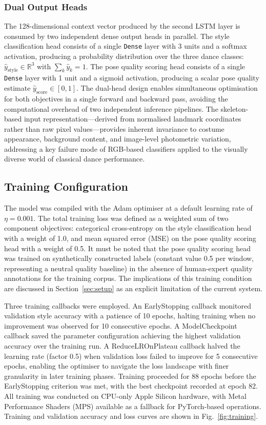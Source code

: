 \documentclass[journal]{IEEEtran}
\begin{document}
\subsubsection{Dual Output Heads}

The 128-dimensional context vector produced by the second LSTM layer
is consumed by two independent dense output heads in parallel.
The style classification head consists of a single \texttt{Dense}
layer with 3 units and a softmax activation, producing a probability
distribution over the three dance classes:
$\hat{y}_\text{style} \in \mathbb{R}^3$ with
$\sum_k \hat{y}_k = 1$. The pose quality scoring head consists of
a single \texttt{Dense} layer with 1 unit and a sigmoid activation,
producing a scalar pose quality estimate $\hat{y}_\text{score}
\in [0, 1]$. The dual-head design enables simultaneous optimisation
for both objectives in a single forward and backward pass, avoiding
the computational overhead of two independent inference pipelines.
The skeleton-based input representation—derived from normalised
landmark coordinates rather than raw pixel values—provides inherent
invariance to costume appearance, background content, and image-level
photometric variation, addressing a key failure mode of RGB-based
classifiers applied to the visually diverse world of classical
dance performance.

\subsection{Training Configuration}

The model was compiled with the Adam optimiser at a default learning
rate of $\eta = 0.001$. The total training loss was defined as a
weighted sum of two component objectives: categorical cross-entropy
on the style classification head with a weight of 1.0, and mean
squared error (MSE) on the pose quality scoring head with a weight
of 0.5. It must be noted that the pose quality scoring head was
trained on synthetically constructed labels (constant value 0.5 per
window, representing a neutral quality baseline) in the absence of
human-expert quality annotations for the training corpus. The
implications of this training condition are discussed in
Section~\ref{sec:setup} as an explicit limitation of the current
system.

Three training callbacks were employed. An EarlyStopping callback
monitored validation style accuracy with a patience of 10 epochs,
halting training when no improvement was observed for 10 consecutive
epochs. A ModelCheckpoint callback saved the parameter configuration
achieving the highest validation accuracy over the training run.
A ReduceLROnPlateau callback halved the learning rate (factor 0.5)
when validation loss failed to improve for 5 consecutive epochs,
enabling the optimiser to navigate the loss landscape with finer
granularity in later training phases. Training proceeded for 88 epochs
before the EarlyStopping criterion was met, with the best checkpoint
recorded at epoch 82. All training was conducted on CPU-only
Apple Silicon hardware, with Metal Performance Shaders (MPS) available
as a fallback for PyTorch-based operations. Training and validation
accuracy and loss curves are shown in Fig.~\ref{fig:training}.
\end{document}
